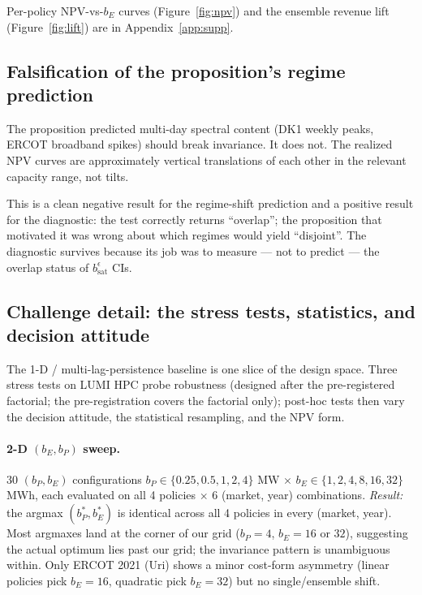 \documentclass[11pt]{article}
\begin{document}
Per-policy NPV-vs-$b_E$ curves (Figure~\ref{fig:npv}) and the ensemble
revenue lift (Figure~\ref{fig:lift}) are in Appendix~\ref{app:supp}.

\subsection{Falsification of the proposition's regime prediction}\label{sec:falsify}

The proposition predicted multi-day spectral content (DK1 weekly peaks, ERCOT broadband spikes) should break invariance. It does not. The realized NPV curves are approximately vertical translations of each other in the relevant capacity range, not tilts.

This is a clean negative result for the regime-shift prediction and a positive result for the diagnostic: the test correctly returns ``overlap''; the proposition that motivated it was wrong about which regimes would yield ``disjoint''. The diagnostic survives because its job was to measure --- not to predict --- the overlap status of $b_{\mathrm{sat}}^\epsilon$ CIs.

\subsection{Challenge detail: the stress tests, statistics, and decision attitude}\label{sec:stress}

The 1-D / multi-lag-persistence baseline is one slice of the design
space. Three stress tests on LUMI HPC probe robustness (designed after
the pre-registered factorial; the pre-registration covers the factorial
only); post-hoc tests then vary the decision attitude, the statistical
resampling, and the NPV form.

\paragraph{2-D $(b_E, b_P)$ sweep.} 30 $(b_P, b_E)$ configurations
$b_P \in \{0.25, 0.5, 1, 2, 4\}$ MW $\times$ $b_E \in \{1, 2, 4, 8, 16, 32\}$
MWh, each evaluated on all 4 policies $\times$ 6 (market, year)
combinations. \emph{Result:} the argmax $(b_P^*, b_E^*)$ is identical
across all 4 policies in every (market, year). Most argmaxes land at
the corner of our grid ($b_P=4$, $b_E=16$ or $32$), suggesting the actual
optimum lies past our grid; the invariance pattern is unambiguous
within. Only ERCOT 2021 (Uri) shows a minor cost-form asymmetry
(linear policies pick $b_E=16$, quadratic pick $b_E=32$) but no
single/ensemble shift.
\end{document}
